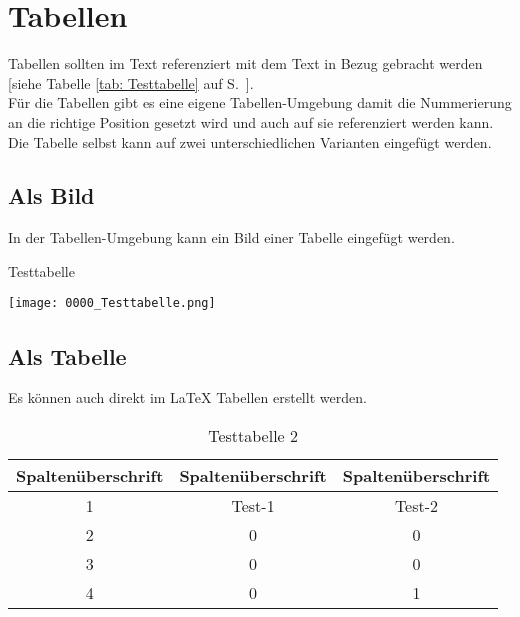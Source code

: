 \section{Tabellen}
Tabellen sollten im Text referenziert \bzw mit dem Text in Bezug gebracht werden [siehe Tabelle \ref{tab: Testtabelle} auf S.~\pageref{tab: Testtabelle}].\\
Für die Tabellen gibt es eine eigene Tabellen-Umgebung damit die Nummerierung an die richtige Position gesetzt wird und auch auf sie referenziert werden kann.\\
Die Tabelle selbst kann auf zwei unterschiedlichen Varianten eingefügt werden.
\subsection{Als Bild}
In der Tabellen-Umgebung kann ein Bild einer Tabelle eingefügt werden.
\begin{table}[h]
	\centering
	\caption{Testtabelle}
	\texttt{[image: 0000\_Testtabelle.png]}
	\label{tab: Testtabelle} 
\end{table}
\subsection{Als Tabelle}
Es können auch direkt im {\LaTeX} Tabellen erstellt werden.
\begin{table}[h]
	\centering
	\caption{Testtabelle 2}
	\begin{tabular}{c|c||c|}
		Spaltenüberschrift & Spaltenüberschrift & Spaltenüberschrift \\
		\midrule[2pt]
		1 & Test-1 & Test-2\\ 
		\hline 2 & 0 & 0  \\ 
		3 & 0 & 0  \\ 
		4 & 0 & 1  \\
		\hline 
	\end{tabular}
	\label{tab: Testtabelle-2} 
\end{table}


\newpage
